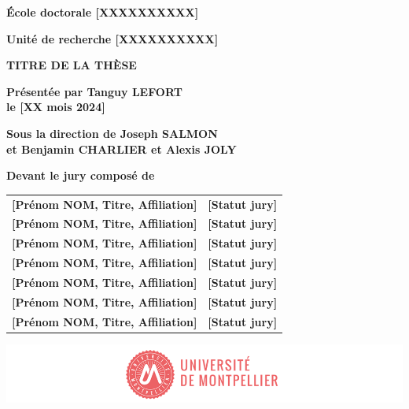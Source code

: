 \documentclass[
a4paper, %
12pt]{book}
\begin{document}
\begin{titlepage}
{\bigskip
\textbf{École doctorale [XXXXXXXXXX]}

\bigskip
\textbf{Unité de recherche [XXXXXXXXXX]}


\color{Titleblue}
\fontsize{17}{20.4}\selectfont
\vspace{2cm}
\textbf{TITRE DE LA THÈSE}


\vspace{4cm}
\fontsize{15}{18}\selectfont
\color{black}
\textbf{Présentée par Tanguy LEFORT\\
le [XX mois 2024]}

\bigskip
\fontsize{13}{15.6}\selectfont
\textbf{Sous la direction de Joseph SALMON\\
et Benjamin CHARLIER et Alexis JOLY }

\vspace{1.5cm}
\normalsize
\textbf{Devant le jury composé de}\\
\bigskip
\fontsize{10}{12}\selectfont
\vspace{1.5mm}
\begin{tabular}{p{14cm}l}
\textbf{[Prénom NOM, Titre, Affiliation]} & \textbf{[Statut jury]} \\
\textbf{[Prénom NOM, Titre, Affiliation]} & \textbf{[Statut jury]} \\
\textbf{[Prénom NOM, Titre, Affiliation]} & \textbf{[Statut jury]} \\
\textbf{[Prénom NOM, Titre, Affiliation]} & \textbf{[Statut jury]} \\
\textbf{[Prénom NOM, Titre, Affiliation]} & \textbf{[Statut jury]} \\
\textbf{[Prénom NOM, Titre, Affiliation]} & \textbf{[Statut jury]} \\
\textbf{[Prénom NOM, Titre, Affiliation]} & \textbf{[Statut jury]} \\
\end{tabular} 
 
\vspace{\fill}
\includegraphics[scale=1]{images/PhD_Couverture_LogoUM.png}
\vspace{-15mm}}
\end{titlepage}


% 
\end{document}
